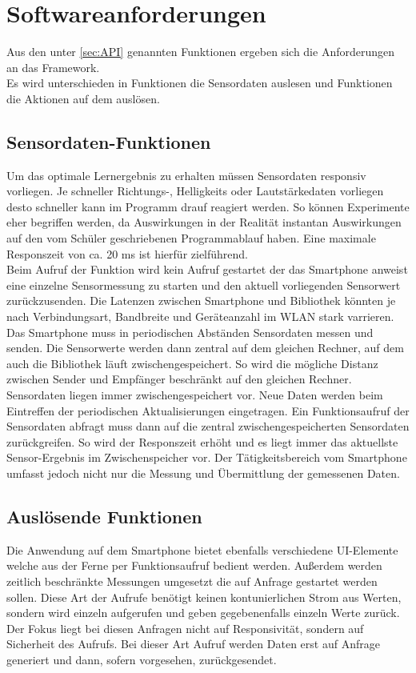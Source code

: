 \documentclass[11pt,a4paper]{report}
\begin{document}
\section{Softwareanforderungen}\label{sec:anforderungen}
Aus den unter \ref*{sec:API} genannten Funktionen ergeben sich die Anforderungen an das Framework.
\\
Es wird unterschieden in Funktionen die Sensordaten auslesen und Funktionen die Aktionen auf dem  auslösen.
\subsection{Sensordaten-Funktionen}
Um das optimale Lernergebnis zu erhalten müssen Sensordaten responsiv vorliegen.
Je schneller Richtungs-, Helligkeits oder Lautstärkedaten vorliegen desto schneller kann im Programm drauf reagiert werden.
So können Experimente eher begriffen werden, da Auswirkungen in der Realität instantan Auswirkungen auf den vom Schüler geschriebenen Programmablauf haben.
Eine maximale Responszeit von ca. 20 ms ist hierfür zielführend.
\\
Beim Aufruf der Funktion wird kein Aufruf gestartet der das Smartphone anweist eine einzelne Sensormessung zu starten und den aktuell vorliegenden Sensorwert zurückzusenden.
Die Latenzen zwischen Smartphone und Bibliothek könnten je nach Verbindungsart, Bandbreite und Geräteanzahl im WLAN stark varrieren.
Das Smartphone muss in periodischen Abständen Sensordaten messen und senden. Die Sensorwerte werden dann zentral auf dem gleichen Rechner, auf dem auch die Bibliothek läuft zwischengespeichert.
So wird die mögliche Distanz zwischen Sender und Empfänger beschränkt auf den gleichen Rechner.
Sensordaten liegen immer zwischengespeichert vor.
Neue Daten werden beim Eintreffen der periodischen Aktualisierungen eingetragen.
Ein Funktionsaufruf der Sensordaten abfragt muss dann auf die zentral zwischengespeicherten Sensordaten zurückgreifen.
So wird der Responszeit erhöht und es liegt immer das aktuellste Sensor-Ergebnis im Zwischenspeicher vor.
Der Tätigkeitsbereich vom Smartphone umfasst jedoch nicht nur die Messung und Übermittlung der gemessenen Daten.

\subsection{Auslösende Funktionen}
Die Anwendung auf dem Smartphone bietet ebenfalls verschiedene UI-Elemente welche aus der Ferne per Funktionsaufruf bedient werden.
Außerdem werden zeitlich beschränkte Messungen umgesetzt die auf Anfrage gestartet werden sollen.
Diese Art der Aufrufe benötigt keinen kontunierlichen Strom aus Werten, sondern wird einzeln aufgerufen und geben gegebenenfalls einzeln Werte zurück.
Der Fokus liegt bei diesen Anfragen nicht auf Responsivität, sondern auf Sicherheit des Aufrufs.
Bei dieser Art Aufruf werden Daten erst auf Anfrage generiert und dann, sofern vorgesehen, zurückgesendet.
\end{document}
